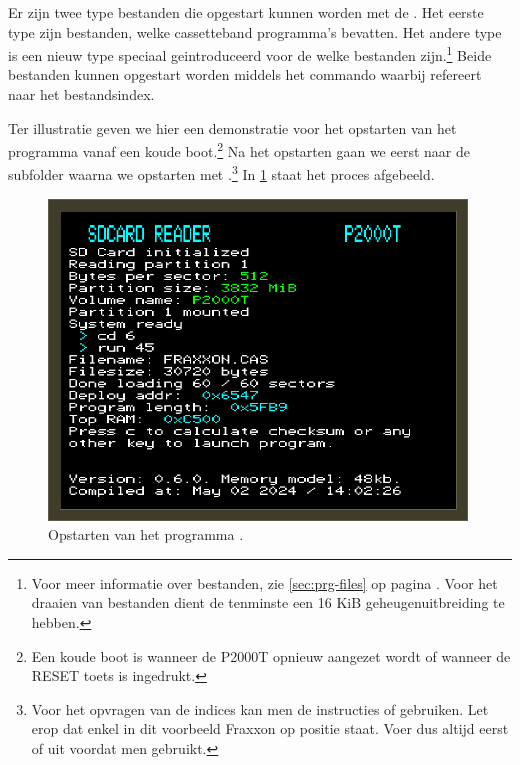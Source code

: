 Er zijn twee type bestanden die opgestart kunnen worden met de \product. Het eerste type zijn  bestanden, welke cassetteband programma's bevatten. Het andere type is een nieuw type speciaal geintroduceerd voor de \product welke  bestanden zijn.\footnote{Voor meer informatie over  bestanden, zie \cref{sec:prg-files} op pagina \pageref{sec:prg-files}. Voor het draaien van  bestanden dient de  tenminste een 16 KiB geheugenuitbreiding te hebben.} Beide bestanden kunnen opgestart worden middels het  commando waarbij  refereert naar het bestandsindex.

Ter illustratie geven we hier een demonstratie voor het opstarten van het programma  vanaf een koude boot.\footnote{Een koude boot is wanneer de P2000T opnieuw aangezet wordt of wanneer de RESET toets is ingedrukt.} Na het opstarten gaan we eerst naar de subfolder  waarna we  opstarten met .\footnote{Voor het opvragen van de indices kan men de instructies  of  gebruiken. Let erop dat enkel in dit voorbeeld Fraxxon op positie  staat. Voer dus altijd eerst  of  uit voordat men  gebruikt.} In \cref{fig:screenshot-run-fraxon} staat het proces afgebeeld.

\begin{figure}[h!]
    \centering
    \includegraphics[width=0.99\textwidth]{img/run-fraxxon.png}
    \caption{Opstarten van het programma .}
    \label{fig:screenshot-run-fraxon}
\end{figure}

